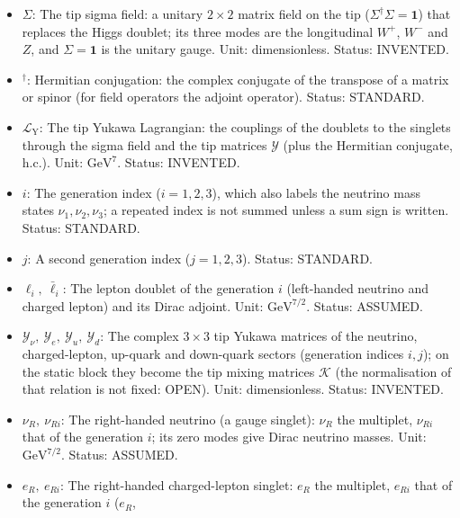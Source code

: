 \documentclass[
  10pt,
]{article}
\begin{document}
\begin{itemize}
  \(\mu\): A four-dimensional coordinate index running over the
  observable coordinates \(x_1, x_2, x_3, x_4\) (signature \(+,+,+,-\));
  on the tip it runs over the tip directions; a repeated index is
  summed. Status: STANDARD.
\item
  \(\Sigma\): The tip sigma field: a unitary \(2 \times 2\) matrix field
  on the tip (\(\Sigma^\dagger\Sigma = \mathbf{1}\)) that replaces the
  Higgs doublet; its three modes are the longitudinal \(W^+\), \(W^-\)
  and \(Z\), and \(\Sigma = \mathbf{1}\) is the unitary gauge. Unit:
  dimensionless. Status: INVENTED.
\item
  \({}^\dagger\): Hermitian conjugation: the complex conjugate of the
  transpose of a matrix or spinor (for field operators the adjoint
  operator). Status: STANDARD.
\item
  \(\mathcal{L}_{\mathrm{Y}}\): The tip Yukawa Lagrangian: the couplings
  of the doublets to the singlets through the sigma field and the tip
  matrices \(\mathcal{Y}\) (plus the Hermitian conjugate, h.c.). Unit:
  \(\mathrm{GeV}^{7}\). Status: INVENTED.
\item
  \(i\): The generation index (\(i = 1, 2, 3\)), which also labels the
  neutrino mass states \(\nu_1, \nu_2, \nu_3\); a repeated index is not
  summed unless a sum sign is written. Status: STANDARD.
\item
  \(j\): A second generation index (\(j = 1, 2, 3\)). Status: STANDARD.
\item
  \(\ell_i,\ \bar\ell_i\): The lepton doublet of the generation \(i\)
  (left-handed neutrino and charged lepton) and its Dirac adjoint. Unit:
  \(\mathrm{GeV}^{7/2}\). Status: ASSUMED.
\item
  \(\mathcal{Y}_\nu,\ \mathcal{Y}_e,\ \mathcal{Y}_u,\ \mathcal{Y}_d\):
  The complex \(3 \times 3\) tip Yukawa matrices of the neutrino,
  charged-lepton, up-quark and down-quark sectors (generation indices
  \(i, j\)); on the static block they become the tip mixing matrices
  \(\mathcal{K}\) (the normalisation of that relation is not fixed:
  OPEN). Unit: dimensionless. Status: INVENTED.
\item
  \(\nu_R,\ \nu_{Ri}\): The right-handed neutrino (a gauge singlet):
  \(\nu_R\) the multiplet, \(\nu_{Ri}\) that of the generation \(i\);
  its zero modes give Dirac neutrino masses. Unit:
  \(\mathrm{GeV}^{7/2}\). Status: ASSUMED.
\item
  \(e_R,\ e_{Ri}\): The right-handed charged-lepton singlet: \(e_R\) the
  multiplet, \(e_{Ri}\) that of the generation \(i\) (\(e_R\),

\end{itemize}
\end{document}
